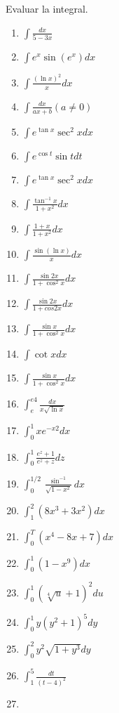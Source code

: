 \documentclass[12pt,]{article}
\begin{document}
Evaluar la integral.

\begin{enumerate}
\def\labelenumi{\arabic{enumi}.}
\setcounter{enumi}{51}
\item
  \(\displaystyle\int\frac{dx}{5-3x}\)
\item
  \(\displaystyle\int e^x\sin(e^x)dx\)
\item
  \(\displaystyle\int\frac{(\ln x)^2}{x}dx\)
\item
  \(\displaystyle\int\frac{dx}{ax+b}(a\ne0)\)
\item
  \(\displaystyle\int e^{\tan x}\sec^2xdx\)
\item
  \(\displaystyle\int e ^{\cos t}\sin t dt\)
\item
  \(\displaystyle\int e^{\tan x}\sec^2x dx\)
\item
  \(\displaystyle\int\frac{\tan^{-1}x}{1+x^2}dx\)
\item
  \(\displaystyle\int\frac{1+x}{1+x^2}dx\)
\item
  \(\displaystyle\int\frac{\sin(\ln x)}{x}dx\)
\item
  \(\displaystyle\int\frac{\sin 2x}{1+\cos^2x}dx\)
\item
  \(\displaystyle\int\frac{\sin 2x}{1+cos2x}dx\)
\item
  \(\displaystyle\int\frac{\sin x}{1+\cos^2x}dx\)
\item
  \(\displaystyle\int\cot x dx\)
\item
  \(\displaystyle\int\frac{\sin x}{1+\cos^2x}dx\)
\item
  \(\displaystyle\int_{e}^{e4}\frac{dx}{x\sqrt{\ln x}}\)
\item
  \(\displaystyle\int_{0}^{1}xe^{-x2}dx\)
\item
  \(\displaystyle\int_{0}^{1}\frac{e^z+1}{e^z+z}dz\)
\item
  \(\displaystyle\int_{0}^{1/2}\frac{\sin^{-1}}{\sqrt{1-x^2}}dx\)
\item
  \(\displaystyle\int_{1}^{2}(8x^3+3x^2)dx\)
\item
  \(\displaystyle\int_{0}^{T}(x^4-8x+7)dx\)
\item
  \(\displaystyle\int_{0}^{1}(1-x^9)dx\)
\item
  \(\displaystyle\int_{0}^{1}(\sqrt[4]{u}+1)^2du\)
\item
  \(\displaystyle\int_{0}^{1}y(y^2+1)^5dy\)
\item
  \(\displaystyle\int_{0}^{2}y^2\sqrt{1+y^3}dy\)
\item
  \(\displaystyle\int_{1}^{5}\frac{dt}{(t-4)^2}\)
\item

\end{enumerate}
\end{document}
